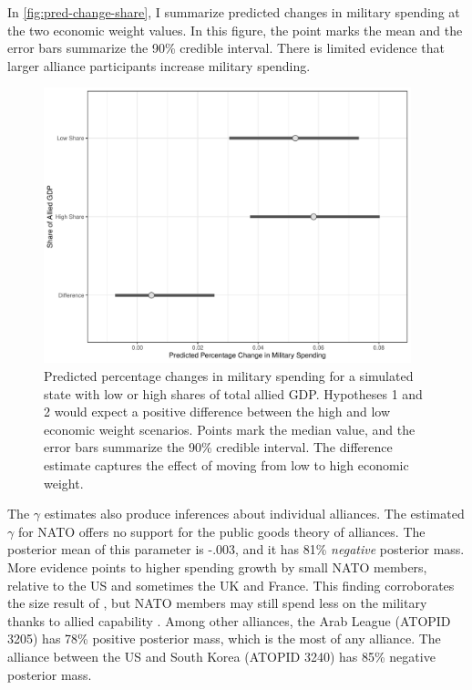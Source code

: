 \documentclass[12pt]{article}
\begin{document}
In \autoref{fig:pred-change-share}, I summarize predicted changes in military spending at the two economic weight values. 
In this figure, the point marks the mean and the error bars summarize the 90\% credible interval. 
There is limited evidence that larger alliance participants increase military spending. 

\begin{figure}[htbp]
	\centering
		\includegraphics[width=0.95\textwidth]{pred-change-share.pdf}
	\caption{Predicted percentage changes in military spending for a simulated state with low or high shares of total allied GDP. Hypotheses 1 and 2 would expect a positive difference between the high and low economic weight scenarios. Points mark the median value, and the error bars summarize the 90\% credible interval. The difference estimate captures the effect of moving from low to high economic weight.}
	\label{fig:pred-change-share}
\end{figure}


The $\gamma$ estimates also produce inferences about individual alliances.
The estimated $\gamma$ for NATO offers no support for the public goods theory of alliances. 
The posterior mean of this parameter is -.003, and it has 81\% \emph{negative} posterior mass.  
More evidence points to higher spending growth by small NATO members, relative to the US and sometimes the UK and France. 
This finding corroborates the size result of \citet{PluemperNeumayer2015}, but NATO members may still spend less on the military thanks to allied capability \citep{GeorgeSandler2017}.
Among other alliances, the Arab League (ATOPID 3205) has 78\% positive posterior mass, which is the most of any alliance. 
The alliance between the US and South Korea (ATOPID 3240) has 85\% negative posterior mass. 
\end{document}
